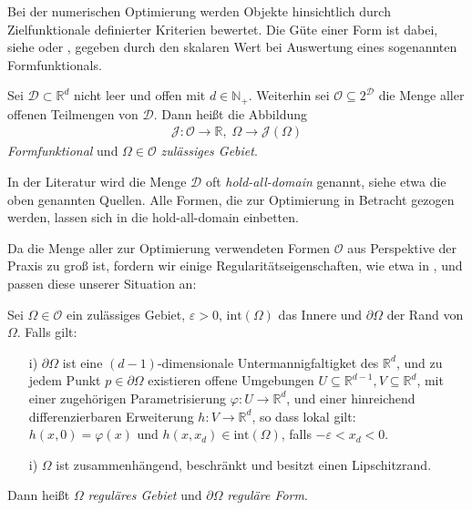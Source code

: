 Bei der numerischen Optimierung werden Objekte hinsichtlich durch Zielfunktionale definierter Kriterien bewertet. Die Güte einer Form ist dabei, siehe \cite{shape_space} oder \cite{bfgs2}, gegeben durch den skalaren Wert bei Auswertung eines sogenannten Formfunktionals.

\begin{defi}[Formfunktional] %
Sei $\mathcal{D}\subset \mathbb{R}^d$ nicht leer und offen mit $d \in \mathbb{N}_+$. Weiterhin sei $\mathcal{O} \subseteq 2^{\mathcal{D}}$ die Menge aller offenen Teilmengen von $\mathcal{D}$. Dann heißt die Abbildung 
\begin{align*}
\mathcal{J}: \mathcal{O} \rightarrow \mathbb{R},\; \Omega \rightarrow \mathcal{J}(\Omega)
\end{align*}
\textit{Formfunktional} und $\Omega \in \mathcal{O}$ \textit{zulässiges Gebiet}.
\end{defi}

In der Literatur wird die Menge $\mathcal{D}$ oft \textit{hold-all-domain} genannt, siehe etwa die oben genannten Quellen. Alle Formen, die zur Optimierung in Betracht gezogen werden, lassen sich in die hold-all-domain einbetten.

Da die Menge aller zur Optimierung verwendeten Formen $\mathcal{O}$ aus Perspektive der Praxis zu groß ist, fordern wir einige Regularitätseigenschaften, wie etwa in \cite{Shape_diff}, und passen diese unserer Situation an:

\begin{defi}\label{regu}
Sei $\Omega \in \mathcal{O}$ ein zulässiges Gebiet, $\varepsilon > 0$, $\text{int}(\Omega)$ das Innere und $\partial\Omega$ der Rand von $\Omega$. Falls gilt:
\begin{itemize}
\item[i)] $\partial \Omega$ ist eine $(d-1)$-dimensionale Untermannigfaltigket des $\mathbb{R}^d$, und zu jedem Punkt $p\in \partial \Omega$ existieren offene Umgebungen $U\subseteq \mathbb{R}^{d-1}, V\subseteq \mathbb{R}^d$, mit einer zugehörigen Parametrisierung $\varphi: U \rightarrow \mathbb{R}^d$, und einer hinreichend differenzierbaren Erweiterung $h: V \rightarrow \mathbb{R}^d$, so dass lokal gilt:\\
$h(x,0) = \varphi(x)$ und $h(x,x_d) \in \text{int}(\Omega)$, falls $-\varepsilon < x_d < 0$.
\item[i)] $\Omega$ ist zusammenhängend, beschränkt und besitzt einen Lipschitzrand.
\end{itemize}
Dann heißt $\Omega$ \textit{reguläres Gebiet} und $\partial\Omega$ \textit{reguläre Form}.
\end{defi}

